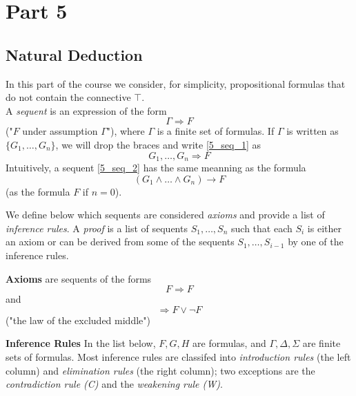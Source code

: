 \section{Part 5}
\subsection{Natural Deduction}
In this part of the course we consider, for simplicity, propositional formulas that do not contain the connective $\top$. \\
A \textit{sequent} is an expression of the form
\begin{equation}
\label{5_seq_1}
\Gamma \Rightarrow F
\end{equation}
("$F$ under assumption $\Gamma$"), where $\Gamma$ is a finite set of formulas. If $\Gamma$ is written as $\{ G_1, \ldots, G_n \}$, we will drop the braces and write \eqref{5_seq_1} as 
\begin{equation}
\label{5_seq_2}
 G_1, \ldots, G_n  \Rightarrow F
\end{equation}
Intuitively, a sequent \eqref{5_seq_2} has the same meanning as the formula 
\begin{equation}
\label{5_seq_3}
(G_1 \wedge \ldots \wedge G_n) \rightarrow F
\end{equation}
(as the formula $F$ if $n = 0$). 

We define below which sequents are considered \textit{axioms} and provide a list of \textit{inference rules}. A \textit{proof} is a list of sequents $S_1, \ldots, S_n$ such that each $S_i$ is either an axiom or can be derived from some of the sequents $S_1, \ldots, S_{i-1}$ by one of the inference rules.

\noindent
\textbf{Axioms} are sequents of the forms
\begin{equation*}
F \Rightarrow F
\end{equation*}
and 
\begin{equation*}
\Rightarrow F \vee \neg F
\end{equation*}
 ("the law of the excluded middle")
 
\noindent
\textbf{Inference Rules} In the list below, $F, G, H$ are formulas, and $\Gamma, \Delta, \Sigma$ are finite sets of formulas. Most inference rules are classifed into \textit{introduction rules} (the left column) and \textit{elimination rules} (the right column); two exceptions are the \textit{contradiction rule (C)} and the \textit{weakening rule (W)}. 



